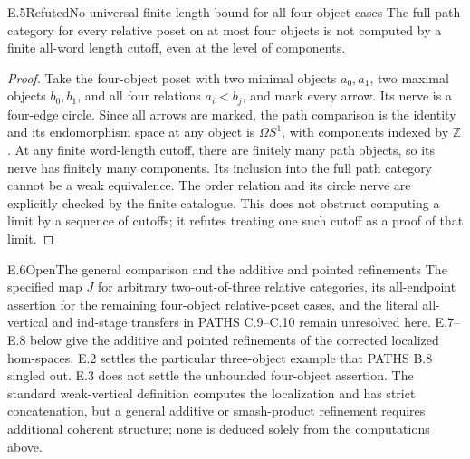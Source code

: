 \begin{result}{E.5}{Refuted}{No universal finite length bound for all four-object cases}
The full path category for every relative poset on at most four objects is not computed by a finite all-word length cutoff, even at the level of components.
\end{result}
\begin{proof}
Take the four-object poset with two minimal objects $a_0,a_1$, two maximal objects $b_0,b_1$, and all four relations $a_i<b_j$, and mark every arrow. Its nerve is a four-edge circle. Since all arrows are marked, the path comparison is the identity and its endomorphism space at any object is $\Omega S^1$, with components indexed by $\mathbb Z$. At any finite word-length cutoff, there are finitely many path objects, so its nerve has finitely many components. Its inclusion into the full path category cannot be a weak equivalence. The order relation and its circle nerve are explicitly checked by the finite catalogue. This does not obstruct computing a limit by a sequence of cutoffs; it refutes treating one such cutoff as a proof of that limit.
\end{proof}

\begin{result}{E.6}{Open}{The general comparison and the additive and pointed refinements}
The specified map $J$ for arbitrary two-out-of-three relative categories, its all-endpoint assertion for the remaining four-object relative-poset cases, and the literal all-vertical and ind-stage transfers in PATHS C.9--C.10 remain unresolved here. E.7--E.8 below give the additive and pointed refinements of the corrected localized hom-spaces. E.2 settles the particular three-object example that PATHS B.8 singled out. E.3 does not settle the unbounded four-object assertion. The standard weak-vertical definition computes the localization and has strict concatenation, but a general additive or smash-product refinement requires additional coherent structure; none is deduced solely from the computations above.
\end{result}

